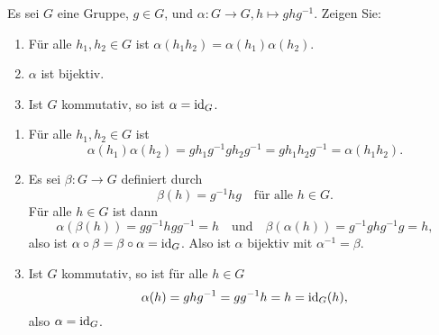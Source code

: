 \begin{question}
 Es sei $G$ eine Gruppe, $g \in G$, und $\alpha \colon G \to G, h \mapsto ghg^{-1}$. Zeigen Sie:
 \begin{enumerate}
  \item
   Für alle $h_1, h_2 \in G$ ist $\alpha(h_1 h_2) = \alpha(h_1) \alpha(h_2)$.
  \item
   $\alpha$ ist bijektiv.
  \item 
   Ist $G$ kommutativ, so ist $\alpha = \operatorname{id}_G$.
 \end{enumerate}
\end{question}
\begin{solution}
 \begin{enumerate}
  \item
   Für alle $h_1, h_2 \in G$ ist
   \[
    \alpha(h_1) \alpha(h_2)
    = g h_1 g^{-1} g h_2 g^{-1}
    = g h_1 h_2 g^{-1}
    = \alpha(h_1 h_2).
   \]
  \item
   Es sei $\beta \colon G \to G$ definiert durch
   \[
    \beta(h) = g^{-1} h g \quad \text{für alle $h \in G$}.
   \]
   Für alle $h \in G$ ist dann
   \[
    \alpha(\beta(h)) = gg^{-1}hgg^{-1} = h
    \quad \text{und} \quad
    \beta(\alpha(h)) = g^{-1}ghg^{-1}g = h,
   \]
   also ist $\alpha \circ \beta = \beta \circ \alpha = \operatorname{id}_G$. Also ist $\alpha$ bijektiv mit $\alpha^{-1} = \beta$.
  \item
   Ist $G$ kommutativ, so ist für alle $h \in G$
   \[
    \alpha(h) = ghg^{-1} = gg^{-1}h = h = \operatorname{id}_G(h),
   \]
   also $\alpha = \operatorname{id}_G$.
 \end{enumerate}
\end{solution}












